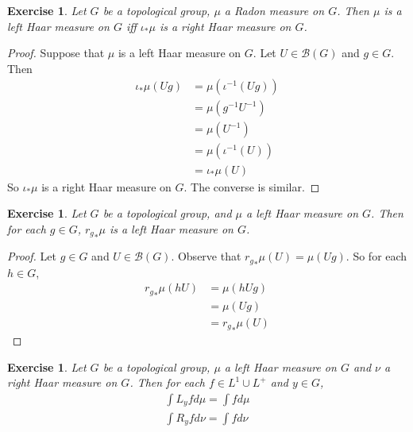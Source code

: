 \documentclass[12pt]{amsart}
\newtheorem{ex}[thm]{Exercise}
\newcommand{\MB}{\mathcal{B}}
\begin{document}
	\begin{ex}
		Let $G$ be a topological group, $\mu$ a Radon measure on $G$. Then $\mu$ is a left Haar measure on $G$ iff $\iota_*\mu$ is a right Haar measure on $G$. 
	\end{ex}
	
	\begin{proof}
		Suppose that $\mu$ is a left Haar measure on $G$. Let $U \in \MB(G)$ and $g \in G$. Then 
		\begin{align*}
			\iota_*\mu(Ug)
			& = \mu(\iota^{-1}(Ug)) \\
			&= \mu (g^{-1}U^{-1}) \\
			&= \mu (U^{-1}) \\
			&= \mu(\iota^{-1}(U)) \\
			&= \iota_*\mu(U)
		\end{align*}
		So $\iota_*\mu$ is a right Haar measure on $G$. The converse is similar.
	\end{proof}

	\begin{ex}
		Let $G$ be a topological group, and $\mu$ a left Haar measure on $G$. Then for each $g \in G$, ${r_{g}}_*\mu$ is a left Haar measure on $G$.
	\end{ex}

	\begin{proof}
		Let $g \in G$ and $U \in \MB(G)$. Observe that ${r_{g}}_*\mu(U) = \mu(Ug)$. So for each $h \in G$, 
		\begin{align*}
			{r_{g}}_*\mu(hU) 
			& = \mu(hUg) \\
			& =  \mu(Ug) \\
			& = {r_{g}}_*\mu(U)
		\end{align*}
	\end{proof}
	
	\begin{ex}
		Let $G$ be a topological group, $\mu$ a left Haar measure on $G$ and $\nu$ a right Haar measure on $G$. Then for each $f \in L^1 \cup L^+$ and $y \in G$, 
		\begin{align}
			\int L_y f d\mu = \int f d\mu \\
			\int R_y f d\nu = \int f d\nu
		\end{align}
	\end{ex}
	
\end{document}
